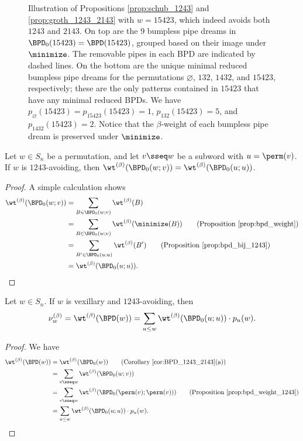 \begin{figure}
    \caption{Illustration of Propositions \ref{prop:schub_1243} and \ref{prop:groth_1243_2143} with $w = 15423$, which indeed avoids both $1243$ and $2143$.
    On top are the 9 bumpless pipe dreams in $\BPD_0(15423) = \BPD(15423)$, grouped based on their image under $\minimize$. The removable pipes in each BPD are indicated by dashed lines.
    On the bottom are the unique minimal reduced bumpless pipe dreams for the permutations $\varnothing$, $132$, $1432$, and $15423$, respectively;
    these are the only patterns contained in $15423$ that have any minimal reduced BPDs.
    We have $p_\varnothing(15423) = p_{15423}(15423) = 1$, $p_{132}(15423) = 5$, and $p_{1432}(15423) = 2$.
    Notice that the $\beta$-weight of each bumpless pipe dream is preserved under $\minimize$.
    }
    \label{fig:gao_example}
\end{figure}

\begin{proposition}
\label{prop:bpd_weight_1243}
    Let $w\in S_n$ be a permutation, and let $v\sseq w$ be a subword with $u = \perm(v)$.
    If $w$ is $1243$-avoiding, then $\wt^{(\beta)}(\BPD_0(w;v)) = \wt^{(\beta)}(\BPD_0(u;u))$.
\end{proposition}

\begin{proof}
    A simple calculation shows \begin{align*}
        \wt^{(\beta)}(\BPD_0(w;v))
        &= \sum_{B\in \BPD_0(w;v)} \wt^{(\beta)}(B) \\
        &= \sum_{B\in \BPD_0(w;v)} \wt^{(\beta)}(\minimize(B))
        \tag{Proposition \ref{prop:bpd_weight}} \\
        &= \sum_{B'\in \BPD_0(u;u)} \wt^{(\beta)}(B')
        \tag{Proposition \ref{prop:bpd_bij_1243}} \\
        &= \wt^{(\beta)}(\BPD_0(u;u)). \qedhere
    \end{align*}
\end{proof}

\begin{proposition}
\label{prop:groth_1243_2143}
    Let $w\in S_n$.
    If $w$ is vexillary and $1243$-avoiding,
    then \[
        \nu^{(\beta)}_w = \wt^{(\beta)}(\BPD(w))
        = \sum_{u\leq w} \wt^{(\beta)}(\BPD_0(u;u))\cdot p_u(w).
    \]
\end{proposition}

\begin{proof}
    We have
    \begin{align*}
        \wt^{(\beta)}(\BPD(w))
        &= \wt^{(\beta)}(\BPD_0(w))
        \tag{Corollary \ref{cor:BPD_1243_2143}(a)} \\
        &= \sum_{v\sseq w} \wt^{(\beta)}(\BPD_0(w;v)) \\
        &= \sum_{v\sseq w} \wt^{(\beta)}(\BPD_0(\perm(v);\perm(v)))
        \tag{Proposition \ref{prop:bpd_weight_1243}} \\
        &= \sum_{u\leq w} \wt^{(\beta)}(\BPD_0(u;u))\cdot p_u(w). \qedhere
    \end{align*}
\end{proof}

